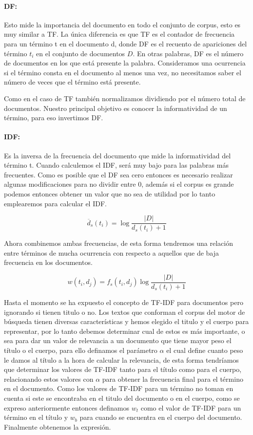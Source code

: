 \documentclass[runningheads,a4paper]{llncs}
\begin{document}
\paragraph*{DF:} Esto mide la importancia del documento en todo el conjunto de corpus, esto es muy similar a TF. La única diferencia es que TF es el contador de frecuencia para un término t en el documento d, donde DF es el recuento de apariciones del término $t_i$ en el conjunto de documentos $D$. En otras palabras, DF es el número de documentos en los que está presente la palabra. Consideramos una ocurrencia si el término consta en el documento al menos una vez, no necesitamos saber el número de veces que el término está presente. 

Como en el caso de TF también normalizamos dividiendo por el número total de documentos. Nuestro principal objetivo es conocer la informatividad de un término, para eso invertimos DF.

\paragraph*{IDF:} Es la inversa de la frecuencia del documento que mide la informatividad del término t. Cuando calculemos el IDF, será muy bajo para las palabras más frecuentes. Como es posible que el DF sea cero entonces es necesario realizar algunas modificaciones para no dividir entre 0, además si el corpus es grande podemos entonces obtener un valor que no sea de utilidad por lo tanto emplearemos para calcular el IDF.

\begin{equation}
	\overline{d}_s(t_i) = \log{\frac{|D|}{d_s(t_i) + 1}}
\end{equation}

Ahora combinemos ambas frecuencias, de esta forma tendremos una relación entre términos de mucha ocurrencia con respecto a aquellos que de baja frecuencia en los documentos.

\begin{equation}
	w(t_i, d_j) = f_s(t_i, d_j) \log{\frac{|D|}{d_s(t_i) + 1}}
\end{equation}

Hasta el momento se ha expuesto el concepto de TF-IDF para documentos pero ignorando si tienen titulo o no. Los textos que conforman el corpus del motor de búsqueda tienen diversas características y hemos elegido el titulo y el cuerpo para representar, por lo tanto debemos determinar cual de estos es más importante, o sea para dar un valor de relevancia a un documento que tiene mayor peso el título o el cuerpo, para ello definamos el parámetro $\alpha$ el cual define cuanto peso le damos al título a la hora de calcular la relevancia, de esta forma tendríamos que determinar los valores de TF-IDF tanto para el título como para el cuerpo, relacionando estos valores con $\alpha$ para obtener la frecuencia final para el término en el documento. Como los valores de TF-IDF para un término no toman en cuenta si este se encontraba en el titulo del documento o en el cuerpo, como se expreso anteriormente entonces definamos $w_t$ como el valor de TF-IDF para un término en el título y $w_b$ para cuando se encuentra en el cuerpo del documento. Finalmente obtenemos la expresión.
\end{document}
